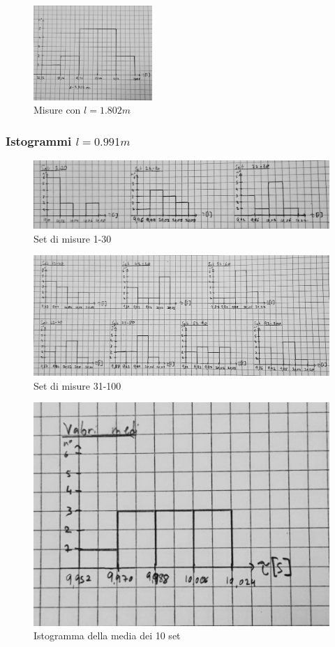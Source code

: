 \documentclass[a4paper]{article}
\begin{document}
\begin{figure}[!h]
    \centering
    \includegraphics[width=0.4\textwidth]{fotopendolo/lunghezza_1802.jpg}
    \caption{Misure con $l=1.802m$}
\end{figure}
\subsubsection{Istogrammi $l=0.991m$}
\begin{figure}[!h]
    \centering
    \includegraphics[width=\textwidth]{fotopendolo/set1-30.jpg}
    \caption{Set di misure 1-30}
\end{figure}
\begin{figure}[!h]
    \centering
    \includegraphics[width=\textwidth]{fotopendolo/setresto.jpg}
    \caption{Set di misure 31-100}
\end{figure}
\begin{figure}[!h]
    \centering
    \includegraphics[width=\textwidth]{fotopendolo/setmedi.jpg}
    \caption{Istogramma della media dei 10 set}
\end{figure}
\end{document}
